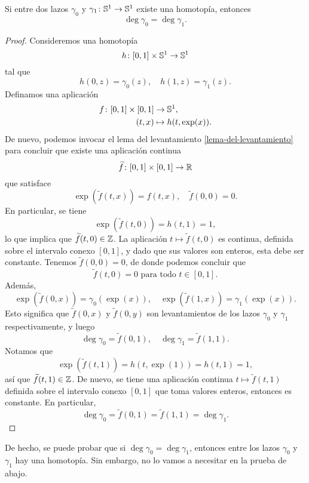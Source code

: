 \documentclass{article}
\numberwithin{equation}{section}
\begin{document}
\begin{lema}
  Si entre dos lazos $\gamma_0$ y $\gamma_1\colon \mathbb{S}^1 \to \mathbb{S}^1$ existe una
  homotopía, entonces
  $$\deg \gamma_0 = \deg \gamma_1.$$

  \begin{proof}
    Consideremos una homotopía
    $$h\colon [0,1]\times \mathbb{S}^1 \to \mathbb{S}^1$$
    tal que
    $$h (0,z) = \gamma_0 (z), \quad h (1,z) = \gamma_1 (z).$$
    Definamos una aplicación
    \begin{align*}
      f\colon [0,1] \times [0,1] & \to \mathbb{S}^1,\\
      (t,x) & \mapsto h (t, \exp (x)).
    \end{align*}
    De nuevo, podemos invocar el lema del levantamiento
    \ref{lema-del-levantamiento} para concluir que existe una aplicación
    continua
    $$\widetilde{f}\colon [0,1]\times [0,1] \to \mathbb{R}$$
    que satisface
    $$\exp (\widetilde{f} (t,x)) = f (t,x), \quad \widetilde{f} (0,0) = 0.$$
    En particular, se tiene
    $$\exp (\widetilde{f} (t,0)) = h (t,1) = 1,$$
    lo que implica que $\widetilde{f} (t,0) \in \mathbb{Z}$. La aplicación
    $t \mapsto \widetilde{f} (t,0)$ es continua, definida sobre el intervalo
    conexo $[0,1]$, y dado que sus valores son enteros, esta debe ser
    constante. Tenemos $\widetilde{f} (0,0) = 0$, de donde podemos concluir que
    $$\widetilde{f} (t,0) = 0\text{ para todo }t\in [0,1].$$
    Además,
    \[ \exp (\widetilde{f} (0,x)) = \gamma_0 (\exp (x)), \quad
      \exp (\widetilde{f} (1,x)) = \gamma_1 (\exp (x)). \]
    Esto significa que $\widetilde{f} (0,x)$ y $\widetilde{f} (0,y)$ son
    levantamientos de los lazos $\gamma_0$ y $\gamma_1$ respectivamente, y luego
    \[ \deg \gamma_0 = \widetilde{f} (0,1), \quad
      \deg \gamma_1 = \widetilde{f} (1,1). \]
    Notamos que
    $$\exp (\widetilde{f} (t,1)) = h (t, \exp (1)) = h (t, 1) = 1,$$
    así que $\widetilde{f} (t,1) \in \mathbb{Z}$. De nuevo, se tiene una aplicación
    continua $t \mapsto \widetilde{f} (t,1)$ definida sobre el intervalo conexo
    $[0,1]$ que toma valores enteros, entonces es constante. En particular,
    $$\deg \gamma_0 = \widetilde{f} (0,1) = \widetilde{f} (1,1) = \deg \gamma_1.$$
  \end{proof}
\end{lema}

\begin{comentario}
  De hecho, se puede probar que si $\deg \gamma_0 = \deg \gamma_1$, entonces
  entre los lazos $\gamma_0$ y $\gamma_1$ hay una homotopía. Sin embargo,
  no lo vamos a necesitar en la prueba de abajo.
\end{comentario}
\end{document}
